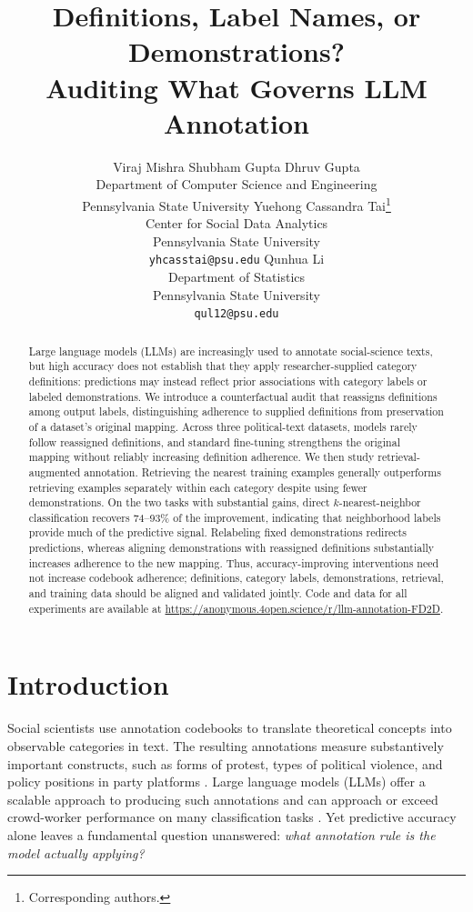 \documentclass[11pt]{article}
\title{Definitions, Label Names, or Demonstrations?\\
Auditing What Governs LLM Annotation}
\author{Viraj Mishra \quad Shubham Gupta \quad Dhruv Gupta \\
    Department of Computer Science and Engineering \\
    Pennsylvania State University
    \AND
    Yuehong Cassandra Tai\thanks{\hspace{1pt}Corresponding authors.} \\
    Center for Social Data Analytics \\
    Pennsylvania State University \\
    \texttt{yhcasstai@psu.edu}
    \And
    Qunhua Li\footnotemark[1] \\
    Department of Statistics \\
    Pennsylvania State University \\
    \texttt{qul12@psu.edu}}
\begin{document}
\maketitle


\begin{abstract}
Large language models (LLMs) are increasingly used to annotate social-science texts, but high accuracy does not establish that they apply researcher-supplied category definitions: predictions may instead reflect prior associations with category labels or labeled demonstrations. We introduce a counterfactual audit that reassigns definitions among output labels, distinguishing adherence to supplied definitions from preservation of a dataset's original mapping. Across three political-text datasets, models rarely follow reassigned definitions, and standard fine-tuning strengthens the original mapping without reliably increasing definition adherence. We then study retrieval-augmented annotation. Retrieving the nearest training examples generally outperforms retrieving examples separately within each category despite using fewer demonstrations. On the two tasks with substantial gains, direct \(k\)-nearest-neighbor classification recovers 74--93\% of the improvement, indicating that neighborhood labels provide much of the predictive signal. Relabeling fixed demonstrations redirects predictions, whereas aligning demonstrations with reassigned definitions substantially increases adherence to the new mapping. Thus, accuracy-improving interventions need not increase codebook adherence; definitions, category labels, demonstrations, retrieval, and training data should be aligned and validated jointly. Code and data for all experiments are available at \url{https://anonymous.4open.science/r/llm-annotation-FD2D}.
\end{abstract}


\section{Introduction}

Social scientists use annotation codebooks to translate theoretical concepts into observable categories in text. The resulting annotations measure substantively important constructs, such as forms of protest, types of political violence, and policy positions in party platforms \citep{grimmer2022text}. Large language models (LLMs) offer a scalable approach to producing such annotations and can approach or exceed crowd-worker performance on many classification tasks \citep{gilardi2023chatgpt,ziems2024can,tornberg2025large}. Yet predictive accuracy alone leaves a fundamental question unanswered: \emph{what annotation rule is the model actually applying?}
\end{document}
